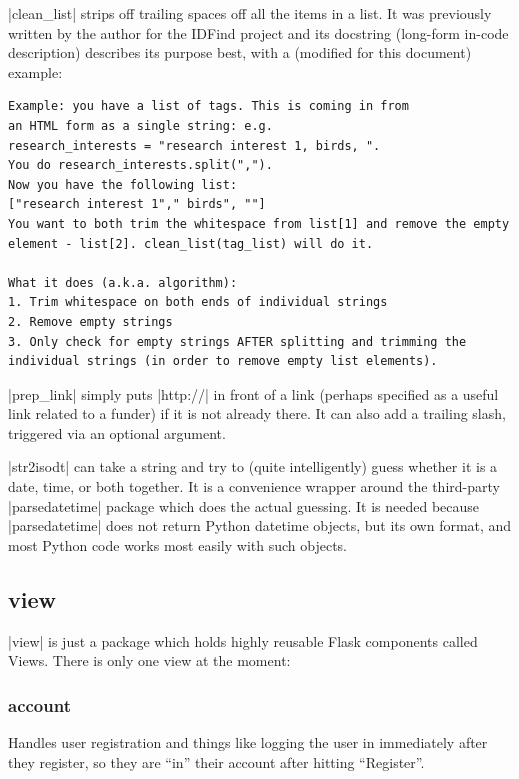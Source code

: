 |clean_list| strips off trailing spaces off all the items in a list. It was previously written by the author for the IDFind project and its docstring (long-form in-code description) describes its purpose best, with a (modified for this document) example:
\begin{verbatim}
Example: you have a list of tags. This is coming in from
an HTML form as a single string: e.g.
research_interests = "research interest 1, birds, ".
You do research_interests.split(",").
Now you have the following list:
["research interest 1"," birds", ""]
You want to both trim the whitespace from list[1] and remove the empty
element - list[2]. clean_list(tag_list) will do it.

What it does (a.k.a. algorithm):
1. Trim whitespace on both ends of individual strings
2. Remove empty strings
3. Only check for empty strings AFTER splitting and trimming the 
individual strings (in order to remove empty list elements).
\end{verbatim}

|prep_link| simply puts |http://| in front of a link (perhaps specified as a useful link related to a funder) if it is not already there. It can also add a trailing slash, triggered via an optional argument.

|str2isodt| can take a string and try to (quite intelligently) guess whether it is a date, time, or both together. It is a convenience wrapper around the third-party |parsedatetime| package which does the actual guessing. It is needed because |parsedatetime| does not return Python datetime objects, but its own format, and most Python code works most easily with such objects.

\subsection{view}
|view| is just a package which holds highly reusable Flask components called Views. There is only one view at the moment:

\subsubsection{account}
Handles user registration and things like logging the user in immediately after they register, so they are ``in'' their account after hitting ``Register''.

